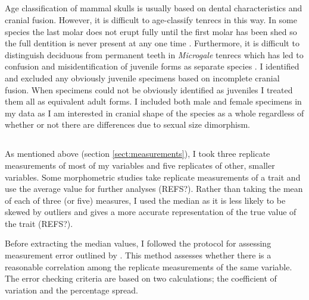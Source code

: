 \subsection{}

	Age classification of mammal skulls is usually based on dental characteristics and cranial fusion.
 	However, it is difficult to age-classify tenrecs in this way. In some species the last molar does not erupt fully until the first molar has been shed so the full dentition is never present at any one time \citep{Nowak1983}. Furthermore, it is difficult to distinguish deciduous from permanent teeth in \textit{Microgale} tenrecs \citep{Asher2008} which has led to confusion and misidentification of juvenile forms as separate species \citep{Olson2004}.
 	I identified and excluded any obviously juvenile specimens based on incomplete cranial fusion. When specimens could not be obviously identified as juveniles I treated them all as equivalent adult forms. 	
	I included both male and female specimens in my data as I am interested in cranial shape of the species as a whole regardless of whether or not there are differences due to sexual size dimorphism.


\subsection{}
	
	As mentioned above (section \ref{sect:measurements}), I took three replicate measurements of most of my variables and five replicates of other, smaller variables. 
	Some morphometric studies take replicate measurements of a trait and use the average value for further analyses (REFS?). Rather than taking the mean of each of three (or five) measures, I used the median as it is less likely to be skewed by outliers and gives a more accurate representation of the true value of the trait (REFS?).
	
	
	Before extracting the median values, I followed the protocol for assessing measurement error outlined by \citep{Cooper2009}. This method assesses whether there is a reasonable correlation among the replicate measurements of the same variable. The error checking criteria are based on two calculations; the coefficient of variation and the percentage spread.
	
